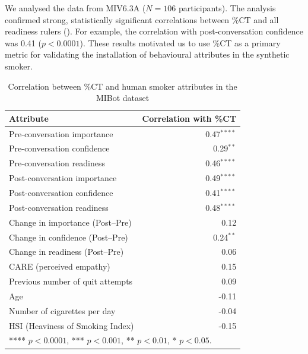 We analysed the data from MIV6.3A ($N=106$ participants). The analysis confirmed strong, statistically significant correlations between \%CT and all readiness rulers (). For example, the correlation with post-conversation confidence was 0.41 ($p < 0.0001$). These results motivated us to use \%CT as a primary metric for validating the installation of behavioural attributes in the synthetic smoker.


\begin{table}[!ht]
	\centering
	\begin{tabular}{@{}lr@{}}
		\toprule
		\textbf{Attribute}               & \textbf{Correlation with \%CT} \\
		\midrule
		Pre-conversation importance      & 0.47$^{****}$                  \\
		Pre-conversation confidence      & 0.29$^{**}$                    \\
		Pre-conversation readiness       & 0.46$^{****}$                  \\
		\midrule
		Post-conversation importance     & 0.49$^{****}$                  \\
		Post-conversation confidence     & 0.41$^{****}$                  \\
		Post-conversation readiness      & 0.48$^{****}$                  \\
		\midrule
		Change in importance (Post--Pre) & 0.12                           \\
		Change in confidence (Post--Pre) & 0.24$^{**}$                    \\
		Change in readiness (Post--Pre)  & 0.06                           \\
		\midrule
		CARE (perceived empathy)         & 0.15                           \\
		Previous number of quit attempts & 0.09                           \\
		Age                              & -0.11                          \\
		Number of cigarettes per day     & -0.04                          \\
		HSI (Heaviness of Smoking Index) & -0.15                          \\
		\bottomrule
		\multicolumn{2}{l}{\footnotesize{**** $p < 0.0001$, *** $p < 0.001$, ** $p < 0.01$, * $p < 0.05$}.}
	\end{tabular}
	\caption{Correlation between \%CT and human smoker attributes in the MIBot dataset}
	\label{tab:ct-correlation}
\end{table}



